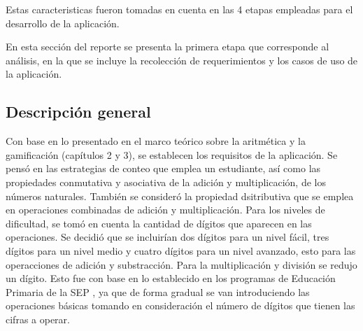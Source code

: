 \documentclass{article}
\begin{document}
Estas caracteristicas fueron tomadas en cuenta en las 4 etapas empleadas para el desarrollo de la aplicación.
 
En esta sección del reporte se presenta la primera etapa que corresponde al análisis, en la que se incluye la recolección de requerimientos y los casos de uso de la aplicación.

\subsection{Descripción general}

Con base en lo presentado en el marco teórico sobre la aritmética y la gamificación (capítulos 2 y 3), se establecen los requisitos de la aplicación.  Se pensó en las estrategias de conteo que emplea un estudiante, así como las propiedades conmutativa y asociativa de la adición y multiplicación, de los números naturales. También se consideró la propiedad dsitributiva que se emplea en operaciones combinadas de adición y multiplicación. Para los niveles de dificultad, se tomó en cuenta la cantidad de dígitos que aparecen en las operaciones. Se decidió que se incluirían dos dígitos para un  nivel fácil, tres dígitos para un nivel medio y cuatro dígitos para un nivel avanzado, esto para las operacciones de adición y substracción. Para la multiplicación y división se redujo un dígito. Esto fue con base en lo establecido en los programas de Educación Primaria de la SEP \cite{aprendizajes2018clave}, ya que de forma gradual se van introduciendo las operaciones básicas tomando en consideración el número de dígitos que tienen las cifras a operar.
\end{document}
